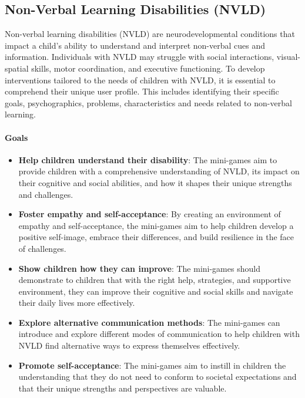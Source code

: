 \subsection{Non-Verbal Learning Disabilities (NVLD)}
Non-verbal learning disabilities (NVLD) are neurodevelopmental conditions that impact a child's ability to understand and interpret non-verbal cues and information. Individuals with NVLD may struggle with social interactions, visual-spatial skills, motor coordination, and executive functioning. To develop interventions tailored to the needs of children with NVLD, it is essential to comprehend their unique user profile. This includes identifying their specific goals, psychographics, problems, characteristics and needs related to non-verbal learning.

\paragraph{Goals}
\begin{itemize}
    \item \textbf{Help children understand their disability}: The mini-games aim to provide children with a comprehensive understanding of NVLD, its impact on their cognitive and social abilities, and how it shapes their unique strengths and challenges.
    \item \textbf{Foster empathy and self-acceptance}: By creating an environment of empathy and self-acceptance, the mini-games aim to help children develop a positive self-image, embrace their differences, and build resilience in the face of challenges.
    \item \textbf{Show children how they can improve}: The mini-games should demonstrate to children that with the right help, strategies, and supportive environment, they can improve their cognitive and social skills and navigate their daily lives more effectively.
    \item \textbf{Explore alternative communication methods}: The mini-games can introduce and explore different modes of communication to help children with NVLD find alternative ways to express themselves effectively.
    \item \textbf{Promote self-acceptance}: The mini-games aim to instill in children the understanding that they do not need to conform to societal expectations and that their unique strengths and perspectives are valuable.
\end{itemize}

